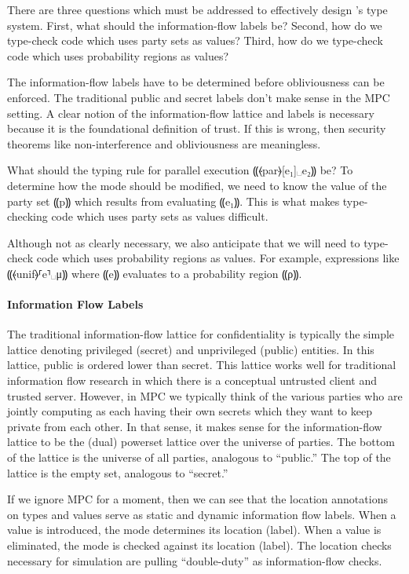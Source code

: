There are three questions which must be addressed to effectively
design \lang's type system. First, what should the information-flow
labels be? Second, how do we type-check code which uses party sets as values?
Third, how do we type-check code which uses probability regions as values?

The information-flow labels have to be determined before obliviousness
can be enforced. The traditional public and secret labels don't make
sense in the MPC setting. A clear notion of the information-flow
lattice and labels is necessary because it is the foundational
definition of trust. If this is wrong, then security
theorems like non-interference and obliviousness are meaningless.

What should the typing rule for parallel execution ⸨⦑par⦒[e₁]␣e₂⸩ be?
To determine how the mode should be modified, we need to know the value
of the party set ⸨p⸩ which results from evaluating ⸨e₁⸩. This is what
makes type-checking code which uses party sets as values difficult.

Although not as clearly necessary, we also anticipate that we will
need to type-check code which uses probability regions as values.
For example, expressions like ⸨⦑unif⦒⸢e⸣␣μ⸩ where ⸨e⸩ evaluates
to a probability region ⸨ρ⸩.

\paragraph*{Information Flow Labels}

The traditional information-flow lattice for confidentiality is
typically the simple lattice denoting privileged (secret) and
unprivileged (public) entities. In this lattice, public is
ordered lower than secret. This lattice works well for traditional
information flow research in which there is a conceptual untrusted
client and trusted server. However, in MPC we typically think of
the various parties who are jointly computing as each having their
own secrets which they want to keep private from each other. In
that sense, it makes sense for the information-flow lattice to
be the (dual) powerset lattice over the universe of parties. The
bottom of the lattice is the universe of all parties, analogous
to ``public.'' The top of the lattice is the empty set, analogous
to ``secret.''

If we ignore MPC for a moment, then we can see that the location
annotations on types and values serve as static and dynamic information
flow labels. When a value is introduced, the mode determines its location (label).
When a value is eliminated, the mode is checked against its location (label).
The location checks necessary for simulation are pulling ``double-duty'' as
information-flow checks.

